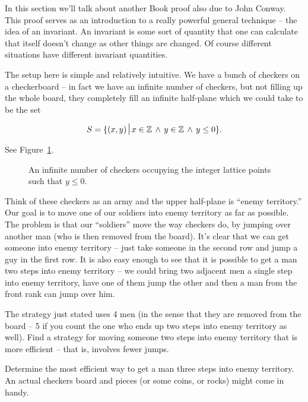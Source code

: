 In this section we'll talk about another Book proof also due to John
Conway.  This proof serves as an introduction to a really powerful
general technique -- the idea of an invariant.  An invariant is some
sort of quantity that one can calculate that itself doesn't change as 
other things are changed.  Of course different situations have different
invariant quantities.  

The setup here is simple and relatively intuitive.  We have a bunch
of checkers on a checkerboard -- in fact we have an infinite number
of checkers, but not filling up the whole board, they completely fill
an infinite half-plane which we could take to be the set

\[ S = \{(x,y) \suchthat x \in \Integers \, \land \, y \in \Integers \, \land \, y \leq 0 \}. \]

See Figure~\ref{fig:the_army}.
 
\begin{figure}[!hbtp] 
\begin{center}

\end{center}
\caption[An infinite army in the lower half-plane.]{An infinite number of
checkers occupying the integer lattice points such that $y\leq 0$.}
\label{fig:the_army}
\end{figure}
  
Think of these checkers as an army and the upper half-plane is ``enemy 
territory.''  Our goal is to move one of our soldiers into enemy territory
as far as possible.  The problem is that our ``soldiers'' move the 
way checkers do, by jumping over another man (who is then removed from 
the board).  It's clear that we can get someone into enemy territory --
just take someone in the second row and jump a guy in the first row.
It is also easy enough to see that it is possible to get a man
two steps into enemy territory -- we could bring two adjacent men
a single step into enemy territory, have one of them jump the other
and then a man from the front rank can jump over him. 

\begin{exer}
The strategy just stated uses 4 men (in the sense that they are removed
from the board -- 5 if you count the one who ends up two steps into
enemy territory as well).  Find a strategy for moving someone two
steps into enemy territory that is more efficient -- that is, involves
fewer jumps.
\end{exer}

\begin{exer}
Determine the most efficient way to get a man three steps into
enemy territory.  An actual checkers board and pieces (or some 
coins, or rocks) might come in handy.
\end{exer}

